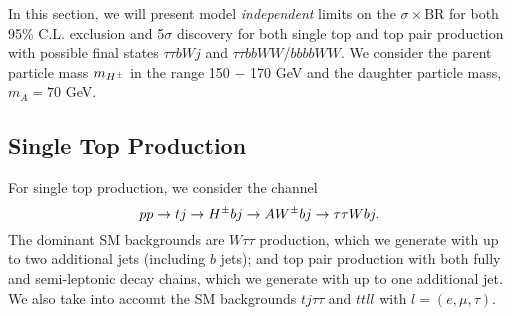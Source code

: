 In this section, we will present model \emph{independent} limits on the $\sigma\times\text{BR}$ for both 95\% C.L.  exclusion and 5$\sigma$ discovery for both single top and top pair production with possible final states  $\tau\tau bW j$ and $\tau\tau bbWW$/$bbbbWW$.   We consider  the parent particle mass $m_{H^{\pm}}$ in the range 150 $-$ 170 GeV and the daughter particle mass,  $m_A=70$ GeV.   


\subsection{Single Top Production}
 \label{sec:analysis_tj}
 
For single top production, we consider the channel\
\begin{equation}
pp\to tj\to H^{\pm} bj\to AW^{\pm}bj \rightarrow \tau\tau W bj.
\end{equation}    The dominant SM backgrounds are $W\tau\tau$ production, which we generate with up to two additional jets (including $b$ jets); and  top pair production with both fully and semi-leptonic decay chains, which we generate with up to one additional jet. We also take into account the SM backgrounds $tj\tau\tau$ and $ttll$ with $l= (e, \mu, \tau)$.

